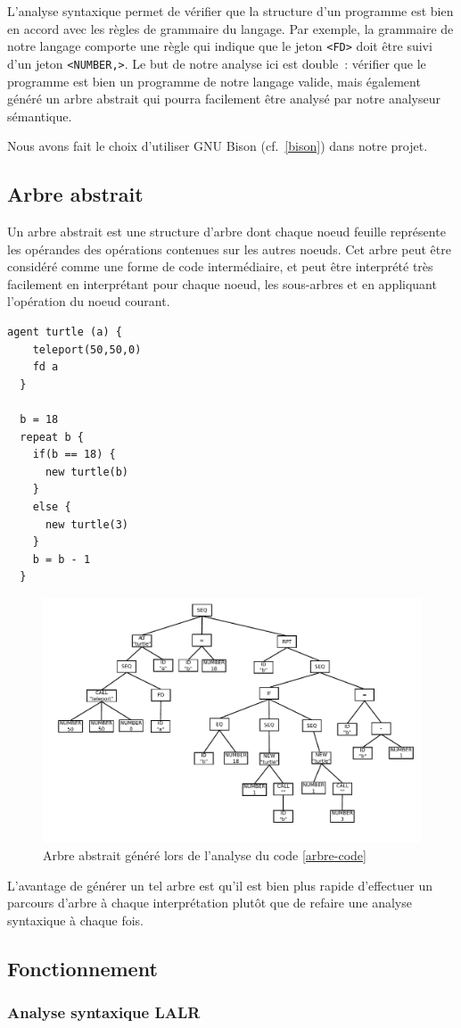 L'analyse syntaxique permet de vérifier que la structure d'un programme est bien en accord avec les règles de grammaire du langage. Par exemple, la grammaire de notre langage comporte une règle qui indique que le jeton \verb|<FD>| doit être suivi d'un jeton \verb|<NUMBER,>|. Le but de notre analyse ici est double~: vérifier que le programme est bien un programme de notre langage valide, mais également généré un arbre abstrait qui pourra facilement être analysé par notre analyseur sémantique.

Nous avons fait le choix d'utiliser GNU Bison (cf.~\ref{bison}) dans notre projet.

\subsection{Arbre abstrait}
Un arbre abstrait est une structure d'arbre dont chaque noeud feuille représente les opérandes des opérations contenues sur les autres noeuds. Cet arbre peut être considéré comme une forme de code intermédiaire, et peut être interprété très facilement en interprétant pour chaque noeud, les sous-arbres et en appliquant l'opération du noeud courant.

\begin{lstlisting}[language=Stibbons,label=arbre-code,caption=Exemple de code Stibbons]
  agent turtle (a) {
    teleport(50,50,0)
    fd a
  }

  b = 18
  repeat b {
    if(b == 18) {
      new turtle(b)
    }
    else {
      new turtle(3)
    }
    b = b - 1
  }
\end{lstlisting}

\begin{figure}[h]
\centering
\includegraphics[scale=0.8]{doc/report/img/arbre-abstrait}
\caption{\label{arbre-abstrait} Arbre abstrait généré lors de l'analyse du code \ref{arbre-code}}
\end{figure}

L'avantage de générer un tel arbre est qu'il est bien plus rapide d'effectuer un parcours d'arbre à chaque interprétation plutôt que de refaire une analyse syntaxique à chaque fois.

\subsection{Fonctionnement}

\subsubsection{Analyse syntaxique LALR}
